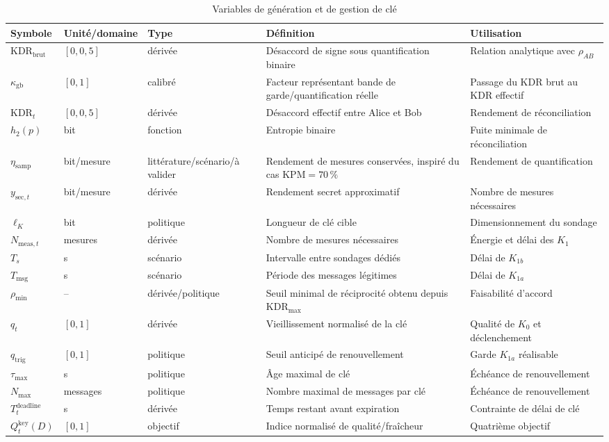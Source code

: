\documentclass[conference,a4paper]{IEEEtran}
\newcommand{\Rkey}{Q^{\mathrm{key}}}
\newcommand{\KDR}{\mathrm{KDR}}
\newcommand{\Hb}{h_2}
\begin{document}
\begin{table}[H]
\caption{Variables de génération et de gestion de clé}
\label{tab:variables-key}
\centering\footnotesize
\begin{tabularx}{\textwidth}{@{}l l l Y Y@{}}
\toprule
Symbole & Unité/domaine & Type & Définition & Utilisation \\
\midrule
$\KDR_{\mathrm{brut}}$ & $[0,0{,}5]$ & dérivée & Désaccord de signe sous quantification binaire & Relation analytique avec $\rho_{AB}$ \\
$\kappa_{\mathrm{gb}}$ & $[0,1]$ & calibré & Facteur représentant bande de garde/quantification réelle & Passage du KDR brut au KDR effectif \\
$\KDR_t$ & $[0,0{,}5]$ & dérivée & Désaccord effectif entre Alice et Bob & Rendement de réconciliation \\
$\Hb(p)$ & bit & fonction & Entropie binaire & Fuite minimale de réconciliation \\
$\eta_{\mathrm{samp}}$ & bit/mesure & littérature/scénario/à valider & Rendement de mesures conservées, inspiré du cas $\mathrm{KPM}=70\,\%$ & Rendement de quantification \\
$y_{\mathrm{sec},t}$ & bit/mesure & dérivée & Rendement secret approximatif & Nombre de mesures nécessaires \\
$\ell_K$ & bit & politique & Longueur de clé cible & Dimensionnement du sondage \\
$N_{\mathrm{meas},t}$ & mesures & dérivée & Nombre de mesures nécessaires & Énergie et délai des $K_1$ \\
$T_s$ & s & scénario & Intervalle entre sondages dédiés & Délai de $K_{1b}$ \\
$T_{\mathrm{msg}}$ & s & scénario & Période des messages légitimes & Délai de $K_{1a}$ \\
$\rho_{\min}$ & -- & dérivée/politique & Seuil minimal de réciprocité obtenu depuis $\KDR_{\max}$ & Faisabilité d'accord \\
$q_t$ & $[0,1]$ & dérivée & Vieillissement normalisé de la clé & Qualité de $K_0$ et déclenchement \\
$q_{\mathrm{trig}}$ & $[0,1]$ & politique & Seuil anticipé de renouvellement & Garde $K_{1a}$ réalisable \\
$\tau_{\max}$ & s & politique & Âge maximal de clé & Échéance de renouvellement \\
$N_{\max}$ & messages & politique & Nombre maximal de messages par clé & Échéance de renouvellement \\
$T_t^{\mathrm{deadline}}$ & s & dérivée & Temps restant avant expiration & Contrainte de délai de clé \\
$\Rkey_t(D)$ & $[0,1]$ & objectif & Indice normalisé de qualité/fraîcheur & Quatrième objectif \\
\bottomrule
\end{tabularx}
\end{table}
\end{document}
